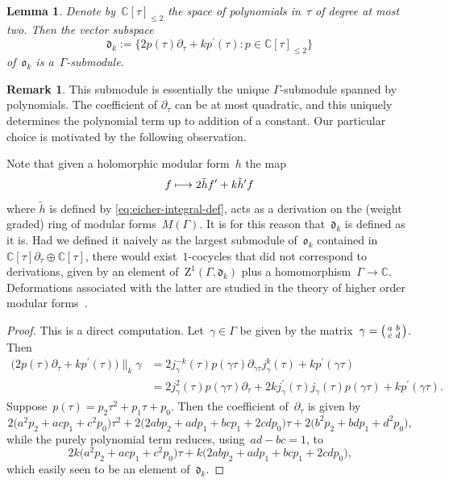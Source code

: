 \documentclass[10pt,a4paper]{article}
\numberwithin{equation}{section}
\theoremstyle{plain}
\newtheorem{lemma}[theoremcounter]{Lemma}
\theoremstyle{definition}
\newtheorem{remark}[theoremcounter]{Remark}
\newcommand{\tx}{\text}
\newcommand{\nbd}{\nobreakdash-\hspace{0pt}}
\newcommand{\bbC}{\ensuremath{\mathbb{C}}}
\newcommand{\frakd}{\ensuremath{\mathfrak{d}}}
\newcommand{\frako}{\ensuremath{\mathfrak{o}}}
\newcommand{\rmZ}{\ensuremath{\mathrm{Z}}}
\newcommand{\defeq}{:=}
\newcommand{\condcol}{\mathrel{:}}
\newenvironment{psmatrix}{\bigl(\begin{smallmatrix}}{\end{smallmatrix}\bigr)}
\let\Ga\Gamma
\let\ga\gamma
\newcommand\mto{\mathchoice{\longmapsto}{\mapsto}{\mapsto}{\mapsto}}
\begin{document}
\begin{lemma}
\label{lem:algebraic-submodule}
Denote by~$\bbC[\tau]_{\leq 2}$ the space of polynomials in~$\tau$ of degree at most two. Then the vector subspace
\begin{equation}
\frakd_k
\defeq
\big\{ 2p(\tau)\partial_\tau + kp^\prime(\tau) \condcol p\in\bbC[\tau]_{\leq 2} \big\}
\end{equation}
of\/~$\frako_k$ is a~$\Ga$\nbd{}submodule.
\end{lemma}

\begin{remark}
This submodule is essentially the unique $\Ga$\nbd{}submodule spanned by polynomials. The coefficient of $\partial_\tau$ can be at most quadratic, and this uniquely determines the polynomial term up to addition of a constant. Our particular choice is motivated by the following observation.

Note that given a holomorphic modular form~$h$ the map
\begin{equation*}
f \mto 2\tilde{h}f^\prime + k \tilde{h}^\prime f
\end{equation*}
where $\tilde{h}$ is defined by \ref{eq:eicher-integral-def}, acts as a derivation on the (weight graded) ring of modular forms~$M(\Ga)$. It is for this reason that~$\frakd_k$ is defined as it is. Had we defined it naively as the largest submodule of~$\frako_k$ contained in~$\bbC[\tau]\partial_\tau\oplus\bbC[\tau]$, there would exist~$1$-cocycles that did not correspond to derivations, given by an element of~$\rmZ^1(\Ga,\frakd_k)$ plus a homomorphism~$\Ga\to\bbC$. Deformations associated with the latter are studied in the theory of higher order modular forms~\cite{goldfeld-2002,chinta-diamantis-osullivan-2002}.
\end{remark}

\begin{proof}
This is a direct computation. Let~$\ga\in\Ga$ be given by the matrix~$\ga = \begin{psmatrix} a & b \\ c& d \end{psmatrix}$. Then
\begin{align*}
\bigl(2p(\tau)\partial_\tau + kp^\prime(\tau) \bigr)\big\|_k\ga
&=
2j_\ga^{-k}(\tau)p(\ga\tau)\partial_{\ga\tau}j_\ga^k(\tau) + k p^\prime(\ga\tau)
\\
&=
2j_\ga^2(\tau)p(\ga\tau)\partial_\tau + 2kj_\ga^\prime(\tau)j_\ga(\tau)p(\ga\tau)+kp^\prime(\ga\tau)
\tx{.}
\end{align*}
Suppose~$p(\tau)=p_2\tau^2 + p_1\tau+ p_0$. Then the coefficient of~$\partial_\tau$ is given by
\begin{equation*}
2 \bigl(a^2 p_2+ac p_1+c^2 p_0\bigr)\tau^2 + 2\bigl(2ab p_2 + ad p_1 + bc p_1 + 2cd p_0\bigr)\tau + 2\bigl(b^2 p_2 + bd p_1 + d^2 p_0\bigr)
\tx{,}
\end{equation*}
while the purely polynomial term reduces, using~$ad-bc=1$, to
\begin{equation*}
2k \bigl(a^2 p_2 + ac p_1 + c^2 p_0 \bigr)\tau + k\bigl(2ab p_2 + ad p_1 + bc p_1 + 2cd p_0 \bigr)
\tx{,}
\end{equation*}
which easily seen to be an element of~$\frakd_k$.
\end{proof}
\end{document}
